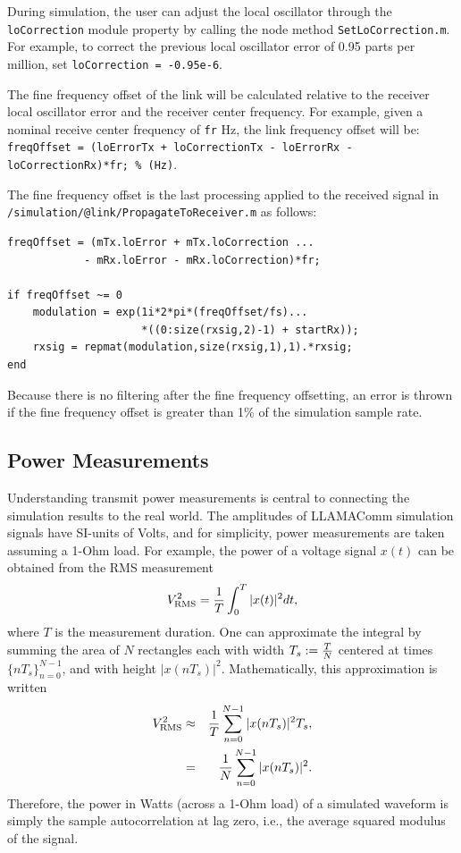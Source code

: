 During simulation, the user can adjust the local oscillator through the \verb+loCorrection+ module property by calling the node method \verb+SetLoCorrection.m+.  For example, to correct the previous local oscillator error of 0.95 parts per million, set \verb+loCorrection = -0.95e-6+.

The fine frequency offset of the link will be calculated relative to the receiver local oscillator error and the receiver center frequency.  For example, given a nominal receive center frequency of \verb+fr+ Hz, the link frequency offset will be: \verb|freqOffset = (loErrorTx + loCorrectionTx - loErrorRx - loCorrectionRx)*fr; % (Hz)|.

The fine frequency offset is the last processing applied to the received signal in \verb+/simulation/@link/PropagateToReceiver.m+ as follows:
\begin{verbatim}
freqOffset = (mTx.loError + mTx.loCorrection ...
            - mRx.loError - mRx.loCorrection)*fr;

if freqOffset ~= 0
    modulation = exp(1i*2*pi*(freqOffset/fs)...
                     *((0:size(rxsig,2)-1) + startRx));
    rxsig = repmat(modulation,size(rxsig,1),1).*rxsig;
end
\end{verbatim}

Because there is no filtering after the fine frequency offsetting, an error is thrown if the fine frequency offset is greater than 1\% of the simulation sample rate.

\subsection{Power Measurements} \label{sec:powermeasurements}
Understanding transmit power measurements is
central to connecting the simulation results to the real world. The amplitudes of LLAMAComm
simulation signals have SI-units of Volts, and for simplicity, power
measurements are taken assuming a 1-Ohm load.  For example, the power of a
voltage signal $x(t)$ can be obtained from the RMS measurement
%
\begin{eqnarray}
    V_{\rm RMS}^2 = \frac{1}{T}\int_0^T |x(t)|^2 dt,
\end{eqnarray}
%
where $T$ is the measurement duration.  One can approximate the integral by
summing the area of $N$ rectangles each with width $T_s := \frac{T}{N}$
centered at times  $\{nT_s\}_{n=0}^{N-1}$, and with height $|x(nT_s)|^2$.
Mathematically, this approximation is written
%
\begin{eqnarray}
    V_{\rm RMS}^2 &\approx& \frac{1}{T}\sum_{n = 0}^{N-1}
        |x(nT_s)|^2T_s,\\
        &=&\frac{1}{N}\sum_{n = 0}^{N-1}|x(nT_s)|^2.
\end{eqnarray}
%
Therefore, the power in Watts (across a 1-Ohm load) of a simulated waveform is
simply the sample autocorrelation at lag zero, i.e., the average squared
modulus of the signal.

